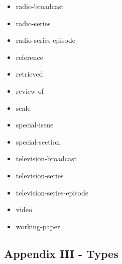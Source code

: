\begin{itemize}
  presented at
\item
  radio-broadcast
\item
  radio-series
\item
  radio-series-episode
\item
  reference
\item
  retrieved
\item
  review-of
\item
  scale
\item
  special-issue
\item
  special-section
\item
  television-broadcast
\item
  television-series
\item
  television-series-episode
\item
  video
\item
  working-paper
\end{itemize}

\hypertarget{appendix-iii---types}{%
\subsection{Appendix III - Types}\label{appendix-iii---types}}

